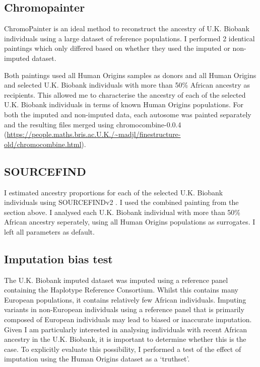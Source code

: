 \subsection{Chromopainter}

ChromoPainter is an ideal method to reconstruct the ancestry of U.K. Biobank individuals using a large dataset of reference populations. I performed 2 identical paintings which only differed based on whether they used the imputed or non-imputed dataset.

Both paintings used all Human Origins samples as donors and all Human Origins and selected U.K. Biobank individuals with more than 50\% African ancestry as recipients. This allowed me to characterise the ancestry of each of the selected U.K. Biobank individuals in terms of known Human Origins populations. For both the imputed and non-imputed data, each autosome was painted separately and the resulting files merged using chromocombine-0.0.4 (\url{https://people.maths.bris.ac.U.K./~madjl/finestructure-old/chromocombine.html}).


\subsection{SOURCEFIND}

I estimated ancestry proportions for each of the selected U.K. Biobank individuals using SOURCEFINDv2 \cite{Chacon-Duque2018}. I used the combined painting from the section above. I analysed each U.K. Biobank individual with more than 50\% African ancestry seperately, using all Human Origins populations as surrogates. I left all parameters as default. 

\subsection{Imputation bias test}

The U.K. Biobank imputed dataset was imputed using a reference panel containing the Haplotype Reference Consortium. Whilst this contains many European populations, it contains relatively few African individuals. Imputing variants in non-European individuals using a reference panel that is primarily composed of European individuals may lead to biased or inaccurate imputation. Given I am particularly interested in analysing individuals with recent African ancestry in the U.K. Biobank, it is important to determine whether this is the case. To explicitly evaluate this possibility, I performed a test of the effect of imputation using the Human Origins dataset as a `truthset'.
 
